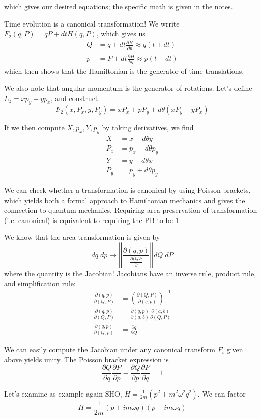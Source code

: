 \documentclass[10pt]{report}
\newcommand{\pd}[2]{\frac{\partial #1}{\partial#2}}
\newcommand{\abs}[1]{\left|#1\right|}
\begin{document}
which gives our desired equations; the specific math is given in the notes.

Time evolution is a canonical transformation! We wrrite $F_2(q,P) = qP + dt H(q,P)$, which gives us 
\begin{align*}
    Q &= q + dt \pd{H}{p} \approx q(t + dt)\\
    p &= P + dt \pd{H}{q} \approx p(t + dt)
\end{align*}
which then shows that the Hamiltonian is the generator of time translations.

We also note that angular momentum is the generator of rotations. Let's define $L_z = xp_y - yp_x$, and construct
$$F_2(x,P_x, y, P_y) = xP_x + pP_y + d\theta(xP_y - yP_x)$$

If we then compute $X,p_x, Y, p_y$ by taking derivatives, we find
\begin{align*}
    X&=x-d\theta y\\
    P_x &= p_x - d\theta p_y\\
    Y &= y + d\theta x\\
    P_y &= p_y + d\theta p_y
\end{align*}

We can check whether a transformation is canonical by using Poisson brackets, which yields both a formal approach to Hamiltonian mechanics and gives the connection to quantum mechanics. Requiring area preservation of transformation (i.e. canonical) is equivalent to requiring the PB to be $1$. 

We know that the area transformation is given by
$$dq\; dp \to \abs{\abs{\frac{\partial (q,p)}{\pd{(QP}{}}}} dQ \; dP$$
where the quantity is the Jacobian! Jacobians have an inverse rule, product rule, and simplification rule:
\begin{align*}
    \pd{(q,p)}{(Q,P)} &= \left(\pd{(Q,P)}{(q,p)}\right)^{-1}\\
    \pd{(q,p)}{(Q,P)} &= \pd{(q,p)}{(a,b)}\pd{(a,b)}{(Q,P)}\\
    \pd{(q,p)}{(Q,p)} &= \pd{q}{Q}
\end{align*}

We can easily compute the Jacobian under any canonical transform $F_i$ given above yields unity. The Poisson bracket expression is
$$\pd{Q}{q}\pd{P}{p} - \pd{Q}{p}\pd{P}{q} = 1$$

Let's examine as example again SHO, $H = \frac{1}{2m}(p^2 + m^2 \omega^2 q^2)$. We can factor
$$H = \frac{1}{2m}\left( p + im\omega q \right)\left( p - im\omega q \right)$$
\end{document}
